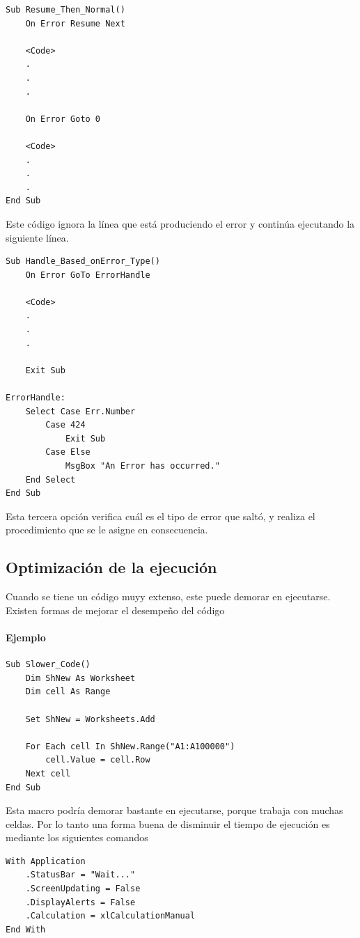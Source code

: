\begin{verbatim}
Sub Resume_Then_Normal()
    On Error Resume Next
    
    <Code>
    .
    .
    .
    
    On Error Goto 0
    
    <Code>
    .
    .
    .
End Sub
\end{verbatim}


Este código ignora la línea que está produciendo el error y continúa ejecutando la siguiente línea.


\begin{verbatim}
Sub Handle_Based_onError_Type()
    On Error GoTo ErrorHandle
    
    <Code>
    .
    .
    .
    
    Exit Sub
    
ErrorHandle:
    Select Case Err.Number
        Case 424
            Exit Sub
        Case Else
            MsgBox "An Error has occurred."
    End Select
End Sub
\end{verbatim}


Esta tercera opción verifica cuál es el tipo de error que saltó, y realiza el procedimiento que se le asigne en consecuencia.

\subsection{Optimización de la ejecución}

Cuando se tiene un código muyy extenso, este puede demorar en ejecutarse. Existen formas de mejorar el desempeño del código

\paragraph{Ejemplo}

\begin{verbatim}
Sub Slower_Code()
    Dim ShNew As Worksheet
    Dim cell As Range
    
    Set ShNew = Worksheets.Add
    
    For Each cell In ShNew.Range("A1:A100000")
        cell.Value = cell.Row
    Next cell
End Sub
\end{verbatim}

Esta macro podría demorar bastante en ejecutarse, porque trabaja con muchas celdas. Por lo tanto una forma buena de disminuir el tiempo de ejecución es mediante los siguientes comandos


\begin{verbatim}
With Application
    .StatusBar = "Wait..."
    .ScreenUpdating = False
    .DisplayAlerts = False
    .Calculation = xlCalculationManual
End With
\end{verbatim}

